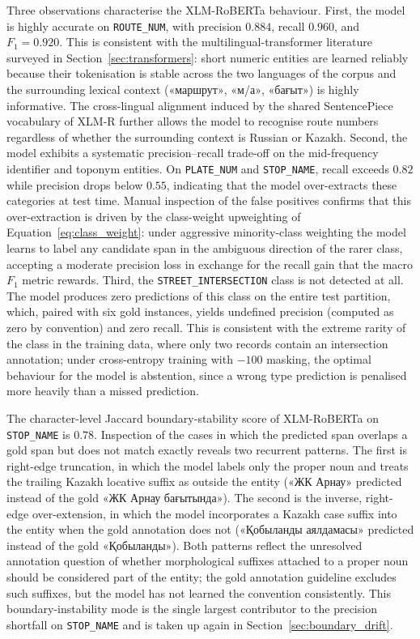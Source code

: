 Three observations characterise the XLM-RoBERTa behaviour. First, the model is highly accurate on \texttt{ROUTE\_NUM}, with precision $0.884$, recall $0.960$, and $F_1 = 0.920$. This is consistent with the multilingual-transformer literature surveyed in Section~\ref{sec:transformers}: short numeric entities are learned reliably because their tokenisation is stable across the two languages of the corpus and the surrounding lexical context (\foreignlanguage{russian}{«маршрут»}, \foreignlanguage{russian}{«м/а»}, \foreignlanguage{russian}{«бағыт»}) is highly informative. The cross-lingual alignment induced by the shared SentencePiece vocabulary of XLM-R further allows the model to recognise route numbers regardless of whether the surrounding context is Russian or Kazakh. Second, the model exhibits a systematic precision--recall trade-off on the mid-frequency identifier and toponym entities. On \texttt{PLATE\_NUM} and \texttt{STOP\_NAME}, recall exceeds $0.82$ while precision drops below $0.55$, indicating that the model over-extracts these categories at test time. Manual inspection of the false positives confirms that this over-extraction is driven by the class-weight upweighting of Equation~\eqref{eq:class_weight}: under aggressive minority-class weighting the model learns to label any candidate span in the ambiguous direction of the rarer class, accepting a moderate precision loss in exchange for the recall gain that the macro $F_1$ metric rewards. Third, the \texttt{STREET\_INTERSECTION} class is not detected at all. The model produces zero predictions of this class on the entire test partition, which, paired with six gold instances, yields undefined precision (computed as zero by convention) and zero recall. This is consistent with the extreme rarity of the class in the training data, where only two records contain an intersection annotation; under cross-entropy training with $-100$ masking, the optimal behaviour for the model is abstention, since a wrong type prediction is penalised more heavily than a missed prediction.

The character-level Jaccard boundary-stability score of XLM-RoBERTa on \texttt{STOP\_NAME} is $0.78$. Inspection of the cases in which the predicted span overlaps a gold span but does not match exactly reveals two recurrent patterns. The first is right-edge truncation, in which the model labels only the proper noun and treats the trailing Kazakh locative suffix as outside the entity (\foreignlanguage{russian}{«ЖК Арнау»} predicted instead of the gold \foreignlanguage{russian}{«ЖК Арнау бағытында»}). The second is the inverse, right-edge over-extension, in which the model incorporates a Kazakh case suffix into the entity when the gold annotation does not (\foreignlanguage{russian}{«Қобыланды аялдамасы»} predicted instead of the gold \foreignlanguage{russian}{«Қобыланды»}). Both patterns reflect the unresolved annotation question of whether morphological suffixes attached to a proper noun should be considered part of the entity; the gold annotation guideline excludes such suffixes, but the model has not learned the convention consistently. This boundary-instability mode is the single largest contributor to the precision shortfall on \texttt{STOP\_NAME} and is taken up again in Section~\ref{sec:boundary_drift}.

